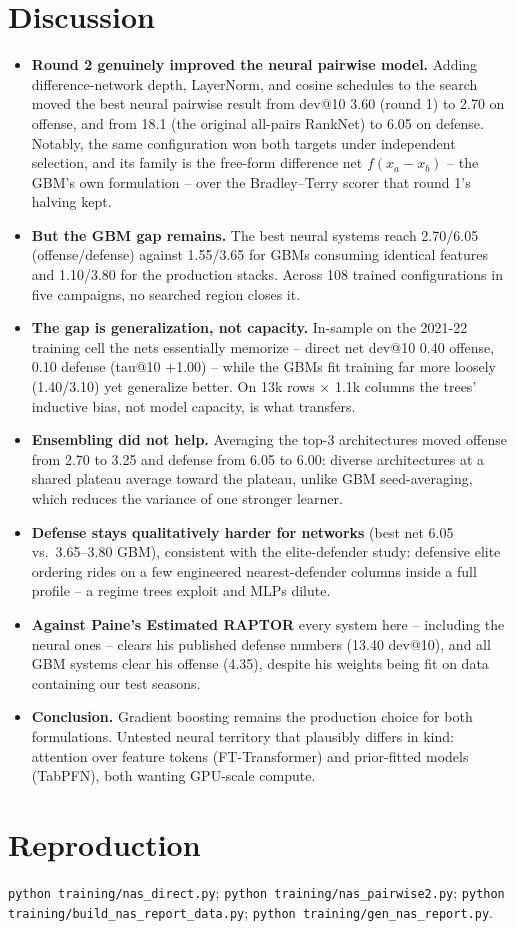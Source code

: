 \documentclass[10pt]{article}
\begin{document}
\section{Discussion}
\begin{itemize}\itemsep2pt
\item \textbf{Round 2 genuinely improved the neural pairwise model.}
Adding difference-network depth, LayerNorm, and cosine schedules to the
search moved the best neural pairwise result from dev@10 3.60 (round 1) to
2.70 on offense, and from 18.1 (the original all-pairs
RankNet) to 6.05 on defense. Notably, the same
configuration won both targets under independent selection, and its family
is the free-form difference net $f(x_a{-}x_b)$ -- the GBM's own
formulation -- over the Bradley--Terry scorer that round 1's halving kept.
\item \textbf{But the GBM gap remains.} The best neural systems reach
2.70/6.05 (offense/defense) against
1.55/3.65 for GBMs consuming identical features and 1.10/3.80 for the
production stacks. Across 108 trained configurations in five campaigns, no
searched region closes it.
\item \textbf{The gap is generalization, not capacity.} In-sample on the
2021-22 training cell the nets essentially memorize -- direct net dev@10
0.40 offense,
0.10 defense (tau@10
+1.00) -- while the GBMs fit training
far more loosely (1.40/3.10)
yet generalize better. On 13k rows $\times$ 1.1k columns the trees'
inductive bias, not model capacity, is what transfers.
\item \textbf{Ensembling did not help.} Averaging the top-3 architectures
moved offense from 2.70 to 3.25 and
defense from 6.05 to 6.00: diverse
architectures at a shared plateau average toward the plateau, unlike GBM
seed-averaging, which reduces the variance of one stronger learner.
\item \textbf{Defense stays qualitatively harder for networks} (best net
6.05 vs.\ 3.65--3.80 GBM), consistent with the
elite-defender study: defensive elite ordering rides on a few engineered
nearest-defender columns inside a full profile -- a regime trees exploit
and MLPs dilute.
\item \textbf{Against Paine's Estimated RAPTOR} every system here --
including the neural ones -- clears his published defense numbers (13.40
dev@10), and all GBM systems clear his offense (4.35), despite his weights
being fit on data containing our test seasons.
\item \textbf{Conclusion.} Gradient boosting remains the production
choice for both formulations. Untested neural territory that plausibly
differs in kind: attention over feature tokens (FT-Transformer) and
prior-fitted models (TabPFN), both wanting GPU-scale compute.
\end{itemize}

\section*{Reproduction}
\texttt{python training/nas\_direct.py};
\texttt{python training/nas\_pairwise2.py};
\texttt{python training/build\_nas\_report\_data.py};
\texttt{python training/gen\_nas\_report.py}.
\end{document}
